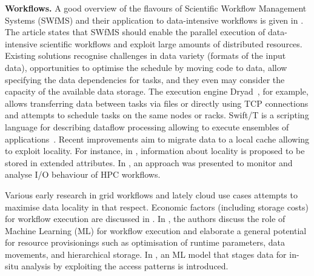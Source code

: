 \documentclass{superfri}
\begin{document}

\textbf{Workflows. }
A good overview of the flavours of Scientific Workflow Management Systems (SWfMS) and their application to data-intensive workflows is given in \cite{liu2015survey}.
The article states that SWfMS should enable the parallel execution of data-intensive scientific workflows and exploit large amounts of distributed resources.
Existing solutions recognise challenges in data variety (formats of the input data), opportunities to optimise the schedule by moving code to data, allow specifying the data dependencies for tasks, and they even may consider the capacity of the available data storage.
The execution engine Dryad~\cite{isard2007dryad}, for example, allows transferring data between tasks via files or directly using TCP connections and attempts to schedule tasks on the same nodes or racks.
Swift/T is a scripting language for describing dataflow processing allowing to execute ensembles of applications~\cite{ozik2016desktop}.
Recent improvements aim to migrate data to a local cache allowing to exploit locality.
For instance, in \cite{dai2018cross}, information about locality is proposed to be stored in extended attributes.
In \cite{TUIBIHWLSC19}, an approach was presented to monitor and analyse I/O behaviour of HPC workflows.

Various early research in grid workflows and lately cloud use cases attempts to maximise data locality in that respect.
Economic factors (including storage costs) for workflow execution are discussed in \cite{alkhanak2016cost}.
In \cite{deelman2019role}, the authors discuss the role of Machine Learning (ML) for workflow execution and elaborate a general potential for resource provisionings such as optimisation of runtime parameters, data movements, and hierarchical storage.
In \cite{subedi2019leveraging}, an ML model that stages data for in-situ analysis by exploiting the access patterns is introduced.


\end{document}

